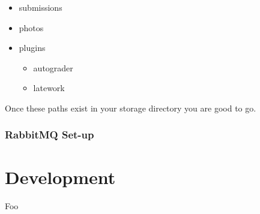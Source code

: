 \documentclass[11pt]{report}
\begin{document}
\begin{itemize}
	\item submissions
	\item photos
	\item plugins
	\begin{itemize}
		\item autograder
		\item latework
	\end{itemize}
\end{itemize}

Once these paths exist in your storage directory you are good to go.

\subsection{RabbitMQ Set-up}

\chapter{Development}
\label{ch:develop}
Foo
\end{document}
